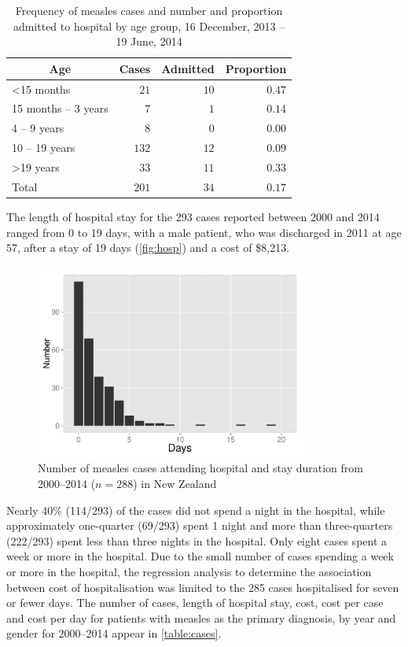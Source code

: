 \documentclass{article}
\begin{document}
\begin{table}
\begin{center}
\begin{tabular}{lrrr}
\hline\hline
\multicolumn{1}{c}{Age}&\multicolumn{1}{c}{Cases}&\multicolumn{1}{c}{Admitted}&\multicolumn{1}{c}{Proportion}\tabularnewline
\hline
\textless 15 months&$ 21$&$10$&$0.47$\tabularnewline
15 months – 3 years&$  7$&$ 1$&$0.14$\tabularnewline
4 – 9 years&$  8$&$ 0$&$0.00$\tabularnewline
10 – 19 years&$132$&$12$&$0.09$\tabularnewline
\textgreater 19 years&$ 33$&$11$&$0.33$\tabularnewline
Total&$201$&$34$&$0.17$\tabularnewline
\hline
\end{tabular}\end{center}\caption{Frequency of measles cases and number and proportion admitted to hospital by age group, 16 December, 2013 -- 19 June, 2014}
\label{table:freq}
\end{table}

The length of hospital stay for the 293 cases reported between 2000 and 2014 ranged from 0 to 19 days, with a male patient, who was discharged in 2011 at age 57, after a stay of 19 days (\autoref{fig:hosp}) and a cost of \$8,213.

\begin{figure}
\begin{center}
     \includegraphics[width=0.8\textwidth]{p.pdf}
\end{center}
\caption{Number of measles cases attending hospital and stay duration from 2000--2014 ($n=288$) in New Zealand}
\label{fig:hosp}
\end{figure}

Nearly 40\% (114/293) of the cases did not spend a night in the hospital, while approximately one-quarter (69/293) spent 1 night and more than three-quarters (222/293) spent less than three nights in the hospital. Only eight cases spent a week or more in the hospital. Due to the small number of cases spending a week or more in the hospital, the regression analysis to determine the association between cost of hospitalisation was limited to the 285 cases hospitalised for seven or fewer days. The number of cases, length of hospital stay, cost, cost per case and cost per day for patients with measles as the primary diagnosis, by year and gender for 2000--2014 appear in \autoref{table:cases}.
\end{document}
